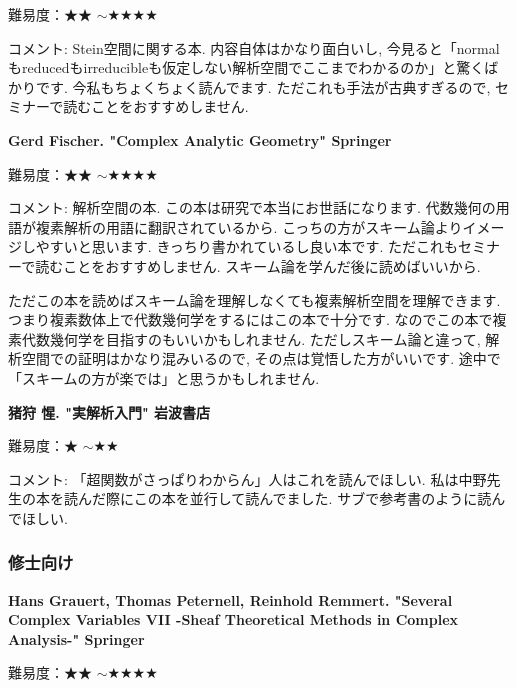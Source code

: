難易度：★★ $\sim$★★★★ 　\vspace{-6pt} 

コメント: Stein空間に関する本. 内容自体はかなり面白いし, 今見ると「normalもreducedもirreducibleも仮定しない解析空間でここまでわかるのか」と驚くばかりです. 今私もちょくちょく読んでます. 
ただこれも手法が古典すぎるので, セミナーで読むことをおすすめしません. 
\vspace{8pt}

\textbf{Gerd Fischer. "Complex Analytic Geometry" Springer}  　\vspace{-6pt} 

難易度：★★ $\sim$★★★★ 　\vspace{-6pt} 

コメント: 解析空間の本. この本は研究で本当にお世話になります. 代数幾何の用語が複素解析の用語に翻訳されているから. こっちの方がスキーム論よりイメージしやすいと思います. きっちり書かれているし良い本です. 
ただこれもセミナーで読むことをおすすめしません. スキーム論を学んだ後に読めばいいから.
 
ただこの本を読めばスキーム論を理解しなくても複素解析空間を理解できます. つまり複素数体上で代数幾何学をするにはこの本で十分です. なのでこの本で複素代数幾何学を目指すのもいいかもしれません. ただしスキーム論と違って, 解析空間での証明はかなり混みいるので, その点は覚悟した方がいいです. 途中で「スキームの方が楽では」と思うかもしれません. 
\vspace{8pt}

\textbf{猪狩 惺. "実解析入門" 岩波書店}  　\vspace{-6pt} 

難易度：★ $\sim$★★ 　\vspace{-6pt} 

コメント: 「超関数がさっぱりわからん」人はこれを読んでほしい. 
私は中野先生の本を読んだ際にこの本を並行して読んでました. 
サブで参考書のように読んでほしい. 

\subsubsection{修士向け}

\textbf{Hans Grauert, Thomas Peternell, Reinhold Remmert. "Several Complex Variables VII -Sheaf Theoretical Methods in Complex Analysis-" Springer}  　\vspace{-6pt} 

難易度：★★ $\sim$★★★★ 　\vspace{-6pt} 

